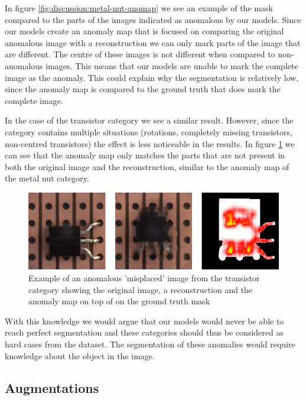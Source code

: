 In figure \ref{fig:discussion:metal-nut-anomap} we see an example of the mask compared to the parts of the images indicated as anomalous by our models. Since our models create an anomaly map that is focused on comparing the original anomalous image with a reconstruction we can only mark parts of the image that are different. The centre of these images is not different when compared to non-anomalous images. This means that our models are unable to mark the complete image as the anomaly. This could explain why the segmentation is relatively low, since the anomaly map is compared to the ground truth that does mark the complete image.

In the case of the transistor category we see a similar result. However, since the category contains multiple situations (rotations, completely missing transistors, non-centred transistors) the effect is less noticeable in the results. In figure \ref{fig:discussion:transistor-anomap} we can see that the anomaly map only matches the parts that are not present in both the original image and the reconstruction, similar to the anomaly map of the metal nut category.

\begin{figure}[ht!]
\centering
\includegraphics[width=\textwidth]{imgs/samples/transistor_misplaced_anomap.jpg}
\caption{Example of an anomalous 'misplaced' image from the transistor category showing the original image, a reconstruction and the anomaly map on top of on the ground truth mask}
\label{fig:discussion:transistor-anomap}
\end{figure}

With this knowledge we would argue that our models would never be able to reach perfect segmentation and these categories should thus be considered as hard cases from the dataset. The segmentation of these anomalies would require knowledge about the object in the image.

\subsection{Augmentations}

